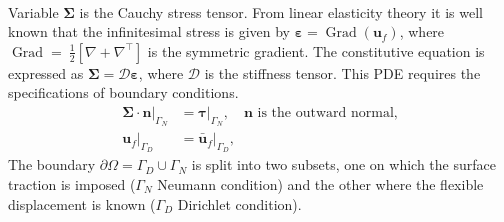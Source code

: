 \documentclass{svjour3}                     %
\DeclareMathOperator*{\Grad}{Grad}
\begin{document}
\begin{itemize}
\begin{equation}
\begin{split}
		\end{split}
	\end{equation}
	Variable $\bm\Sigma$ is the Cauchy stress tensor. From linear elasticity theory it is well known that the infinitesimal stress is given by $\bm\varepsilon = \Grad(\bm{u}_f)$, where $\Grad=~\frac{1}{2}[\nabla+\nabla^\top]$ is the symmetric gradient. The constitutive equation is expressed as $\bm\Sigma =  \bm{\mathcal{D}} \bm\varepsilon$, where $ \bm{\mathcal{D}}$ is the stiffness tensor. This PDE requires the specifications of boundary conditions.
	\begin{equation}
	\label{eq:bcPDE}
	\begin{aligned}
	\bm\Sigma \cdot \bm{n}|_{\Gamma_N} &= \bm\tau|_{\Gamma_N}, \quad \text{$\bm{n}$ is the outward normal,} \\
	\bm{u}_f|_{\Gamma_D} &= \bm{\bar{u}}_f|_{\Gamma_D},
	\end{aligned}
	\end{equation}
	The boundary $\partial \Omega = \Gamma_D \cup \Gamma_N$ is split into two subsets, one on which the surface traction is imposed ($\Gamma_N$ Neumann condition) and the other where the flexible displacement is known ($\Gamma_D$ Dirichlet condition). 
\end{itemize}
\end{document}
